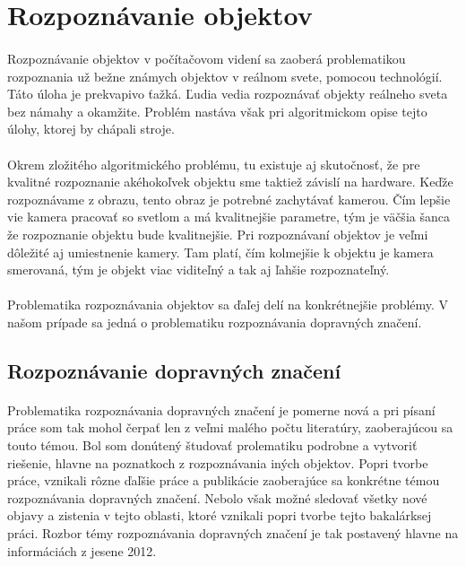 \documentclass[12pt]{article}
\begin{document}
\section{Rozpoznávanie objektov}
\paragraph{}
Rozpoznávanie objektov v počítačovom videní sa zaoberá problematikou rozpoznania už bežne známych objektov v reálnom svete, pomocou technológií.
Táto úloha je prekvapivo ťažká. Ľudia vedia rozpoznávať objekty reálneho sveta bez námahy a okamžite. Problém nastáva však pri algoritmickom opise tejto úlohy, ktorej by chápali stroje.
\cite{machine_vission}
\paragraph{}
Okrem zložitého algoritmického problému, tu existuje aj skutočnosť, že pre kvalitné rozpoznanie akéhokoľvek objektu sme taktiež závislí na hardware.
Keďže rozpoznávame z obrazu, tento obraz je potrebné zachytávať kamerou. Čím lepšie vie kamera pracovať so svetlom a má kvalitnejšie parametre, tým je väčšia šanca že rozpoznanie objektu bude kvalitnejšie.
Pri rozpoznávaní objektov je veľmi dôležité aj umiestnenie kamery. Tam platí, čím kolmejšie k objektu je kamera smerovaná, tým je objekt viac viditeľný a tak aj ľahšie rozpoznateľný. 
\cite{machine_vission}
\paragraph{}
Problematika rozpoznávania objektov sa ďaľej delí na konkrétnejšie problémy. V našom prípade sa jedná o problematiku rozpoznávania dopravných značení.
\cite{machine_vission}
\subsection{Rozpoznávanie dopravných značení}
\paragraph{}
Problematika rozpoznávania dopravných značení je pomerne nová a pri písaní práce som tak mohol čerpať len z veľmi malého počtu literatúry, zaoberajúcou sa touto témou.
Bol som donútený študovať prolematiku podrobne a vytvoriť riešenie, hlavne na poznatkoch z rozpoznávania iných objektov.
Popri tvorbe práce, vznikali rôzne ďaľšie práce a publikácie zaoberajúce sa konkrétne témou rozpoznávania dopravných značení.
Nebolo však možné sledovať všetky nové objavy a zistenia v tejto oblasti, ktoré vznikali popri tvorbe tejto bakalárksej práci.
Rozbor témy rozpoznávania dopravných značení je tak postavený hlavne na informáciách z jesene 2012.
\end{document}
